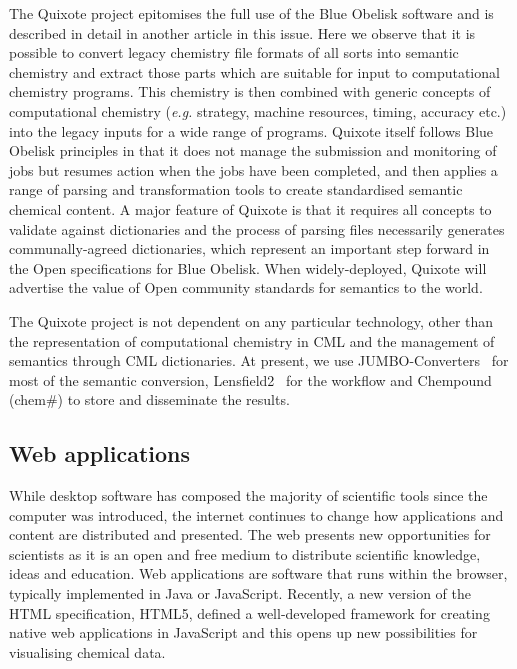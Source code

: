 \documentclass[10pt]{bmc_article}
\newenvironment{bmcformat}{\begin{raggedright}\baselineskip20pt\sloppy\setboolean{publ}{false}}{\end{raggedright}\baselineskip20pt\sloppy}
\begin{document}
\begin{bmcformat}
The Quixote project epitomises the full use of the Blue Obelisk
software and is described in detail in another article
in this issue. Here we observe that it is possible
to convert legacy chemistry file formats
of all sorts into semantic chemistry and extract
those parts which are suitable for input to computational chemistry
programs. This chemistry is then combined with
generic concepts of computational chemistry ({\it e.g.} strategy,
machine resources, timing, accuracy etc.) into the
legacy inputs for a wide range of programs. Quixote itself follows
Blue Obelisk principles in that it does not manage
the submission and monitoring of jobs but resumes action when the jobs
have been completed, and then applies a range
of parsing and transformation tools to create standardised semantic
chemical content. A major feature of Quixote is
that it requires all concepts to validate against dictionaries and the
process of parsing files necessarily generates
communally-agreed dictionaries, which represent an important step
forward in the Open specifications for Blue Obelisk.
When widely-deployed, Quixote will advertise the value of Open
community standards for semantics to the world.

The Quixote project is not dependent on any particular technology,
other than the representation of computational
chemistry in CML and the management of semantics through CML
dictionaries. At present, we use JUMBO-Converters~\cite{JUMBO-Converters} for most
 of the semantic conversion, Lensfield2~\cite{Lensfield2} for the workflow and Chempound
(chem\#) \cite{Chempound} to store and disseminate the results.

\subsection*{Web applications}

While desktop software has composed the majority of scientific tools
since the computer was introduced, the internet continues to change
how applications and content are distributed and presented. The web
presents new opportunities for scientists as it is
an open and free medium to distribute scientific knowledge, ideas and
education. Web applications are software that runs within the browser,
typically implemented in Java or JavaScript.
Recently, a new version of the HTML
specification, HTML5, defined a well-developed framework
for creating native web applications in JavaScript and this opens up
new possibilities for visualising chemical data.


\end{bmcformat}
\end{document}
